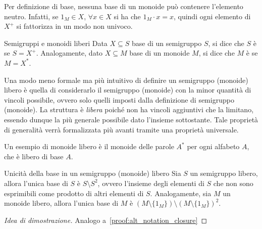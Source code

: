 \begin{note}[label=note:no_neutral_in_base]{}
  Per definizione di base, nessuna base di un monoide può contenere l'elemento neutro.
  Infatti, se \(1_M \in X\), \(\forall x \in X\) si ha che \(1_M \cdot x = x\), quindi ogni elemento di \(X^{+}\) si fattorizza in un modo non univoco.
\end{note}

\begin{definition}{Semigruppi e monoidi liberi}
  Data \(X \subseteq S\) base di un semigruppo \(S\), si dice che \(S\) è  se \(S = X^{+}\).
  Analogamente, dato \(X \subseteq M\) base di un monoide \(M\), si dice che \(M\) è  se \(M = X^{*}\).
\end{definition}
Una modo meno formale ma più intuitivo di definire un semigruppo (monoide) libero è quella di considerarlo il semigruppo (monoide) con la minor quantità di vincoli possibile, ovvero solo quelli imposti dalla definizione di semigruppo (monoide).
La struttura è \emph{libera} poiché non ha vincoli aggiuntivi che la limitano, essendo dunque la più generale possibile dato l'insieme sottostante.
Tale proprietà di generalità verrà formalizzata più avanti tramite una proprietà universale.

Un esempio di monoide libero è il monoide delle parole \(A^*\) per ogni alfabeto \(A\), che è libero di base \(A\).

\begin{proposition}{Unicità della base in un semigruppo (monoide) libero}
  Sia \(S\) un semigruppo libero, allora l'unica base di \(S\) è \(S \setminus S^2\), ovvero l'insieme degli elementi di \(S\) che non sono esprimibili come prodotto di altri elementi di \(S\).
  Analogamente, sia \(M\) un monoide libero, allora l'unica base di \(M\) è \((M\setminus \{1_M\}) \setminus {(M\setminus \{1_M\})}^2\).
\end{proposition}
\begin{proof}[Idea di dimostrazione]
  Analogo a~\ref{proof:alt_notation_closure}
\end{proof}

